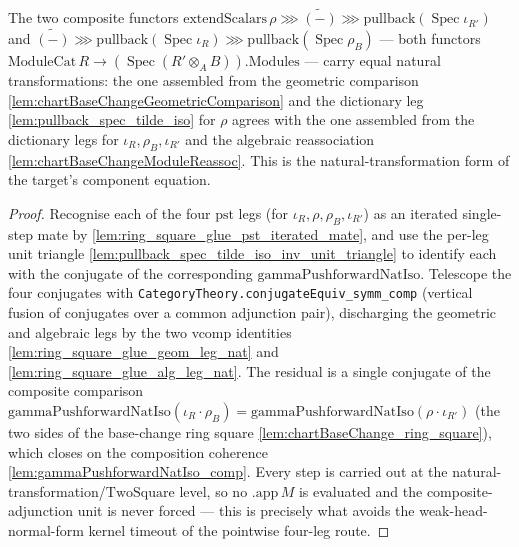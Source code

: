 \begin{lemma}
  \label{lem:ring_square_glue_natTrans}
  The two composite functors
  \(\mathrm{extendScalars}\,\rho \ggg \widetilde{(-)} \ggg \mathrm{pullback}(\operatorname{Spec}\iota_{R'})\)
  and
  \(\widetilde{(-)} \ggg \mathrm{pullback}(\operatorname{Spec}\iota_R) \ggg \mathrm{pullback}(\operatorname{Spec}\rho_B)\)
  --- both functors \(\mathrm{ModuleCat}\,R \to (\operatorname{Spec}(R'\otimes_A B)).\mathrm{Modules}\)
  --- carry equal natural transformations: the one assembled from the geometric comparison
  \cref{lem:chartBaseChangeGeometricComparison} and the dictionary leg
  \cref{lem:pullback_spec_tilde_iso} for \(\rho\) agrees with the one assembled from the dictionary
  legs for \(\iota_R,\rho_B,\iota_{R'}\) and the algebraic reassociation
  \cref{lem:chartBaseChangeModuleReassoc}. This is the natural-transformation form of the target's
  component equation.
  \begin{proof}
    Recognise each of the four \(\mathrm{pst}\) legs (for \(\iota_R,\rho,\rho_B,\iota_{R'}\)) as an
    iterated single-step mate by \cref{lem:ring_square_glue_pst_iterated_mate}, and use the per-leg
    unit triangle \cref{lem:pullback_spec_tilde_iso_inv_unit_triangle} to identify each with the
    conjugate of the corresponding \(\mathrm{gammaPushforwardNatIso}\). Telescope the four conjugates
    with \texttt{CategoryTheory.conjugateEquiv\_symm\_comp} (vertical fusion of conjugates over a common
    adjunction pair), discharging the geometric and algebraic legs by the two vcomp identities
    \cref{lem:ring_square_glue_geom_leg_nat} and \cref{lem:ring_square_glue_alg_leg_nat}. The residual
    is a single conjugate of the composite comparison
    \(\mathrm{gammaPushforwardNatIso}(\iota_R \cdot \rho_B) =
    \mathrm{gammaPushforwardNatIso}(\rho \cdot \iota_{R'})\) (the two sides of the base-change ring
    square \cref{lem:chartBaseChange_ring_square}), which closes on the composition coherence
    \cref{lem:gammaPushforwardNatIso_comp}. Every step is carried out at the
    natural-transformation/\(\mathrm{TwoSquare}\) level, so no \(\mathrm{.app}\,M\) is evaluated and the
    composite-adjunction unit is never forced --- this is precisely what avoids the weak-head-normal-form
    kernel timeout of the pointwise four-leg route.
  \end{proof}
\end{lemma}

